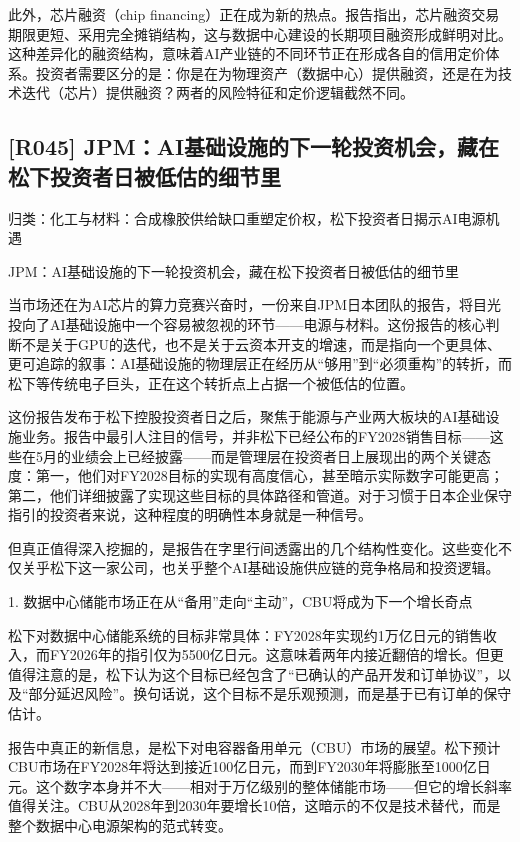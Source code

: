 \documentclass[11pt]{ctexart}
\begin{document}
此外，芯片融资（chip financing）正在成为新的热点。报告指出，芯片融资交易期限更短、采用完全摊销结构，这与数据中心建设的长期项目融资形成鲜明对比。这种差异化的融资结构，意味着AI产业链的不同环节正在形成各自的信用定价体系。投资者需要区分的是：你是在为物理资产（数据中心）提供融资，还是在为技术迭代（芯片）提供融资？两者的风险特征和定价逻辑截然不同。

\subsection{[R045] JPM：AI基础设施的下一轮投资机会，藏在松下投资者日被低估的细节里}
{\small\color{refgray}归类：化工与材料：合成橡胶供给缺口重塑定价权，松下投资者日揭示AI电源机遇}

JPM：AI基础设施的下一轮投资机会，藏在松下投资者日被低估的细节里

当市场还在为AI芯片的算力竞赛兴奋时，一份来自JPM日本团队的报告，将目光投向了AI基础设施中一个容易被忽视的环节——电源与材料。这份报告的核心判断不是关于GPU的迭代，也不是关于云资本开支的增速，而是指向一个更具体、更可追踪的叙事：AI基础设施的物理层正在经历从“够用”到“必须重构”的转折，而松下等传统电子巨头，正在这个转折点上占据一个被低估的位置。

这份报告发布于松下控股投资者日之后，聚焦于能源与产业两大板块的AI基础设施业务。报告中最引人注目的信号，并非松下已经公布的FY2028销售目标——这些在5月的业绩会上已经披露——而是管理层在投资者日上展现出的两个关键态度：第一，他们对FY2028目标的实现有高度信心，甚至暗示实际数字可能更高；第二，他们详细披露了实现这些目标的具体路径和管道。对于习惯于日本企业保守指引的投资者来说，这种程度的明确性本身就是一种信号。

但真正值得深入挖掘的，是报告在字里行间透露出的几个结构性变化。这些变化不仅关乎松下这一家公司，也关乎整个AI基础设施供应链的竞争格局和投资逻辑。

1. 数据中心储能市场正在从“备用”走向“主动”，CBU将成为下一个增长奇点

松下对数据中心储能系统的目标非常具体：FY2028年实现约1万亿日元的销售收入，而FY2026年的指引仅为5500亿日元。这意味着两年内接近翻倍的增长。但更值得注意的是，松下认为这个目标已经包含了“已确认的产品开发和订单协议”，以及“部分延迟风险”。换句话说，这个目标不是乐观预测，而是基于已有订单的保守估计。

报告中真正的新信息，是松下对电容器备用单元（CBU）市场的展望。松下预计CBU市场在FY2028年将达到接近100亿日元，而到FY2030年将膨胀至1000亿日元。这个数字本身并不大——相对于万亿级别的整体储能市场——但它的增长斜率值得关注。CBU从2028年到2030年要增长10倍，这暗示的不仅是技术替代，而是整个数据中心电源架构的范式转变。
\end{document}
